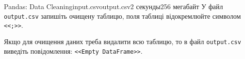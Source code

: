 \begin{problem}{Pandas: Data Cleaning}{input.csv}{output.csv}{2 секунды}{256 мегабайт}
\OutputFile
У файл \texttt{output.csv} запишіть очищену таблицю, поля таблиці відокремлюйте символом \texttt{<<;>>}.

Якщо для очищення даних треба видалити всю таблицю, то в файл \texttt{output.csv} виведіть повідомлення:  \texttt{<<Empty DataFrame>>}.

\Example
\begin{example}
%
\end{example}


\end{problem}

